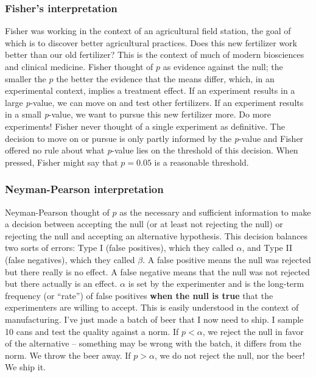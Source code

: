 \documentclass[]{book}
\begin{document}
\subsubsection{Fisher's interpretation}\label{fishers-interpretation}

Fisher was working in the context of an agricultural field station, the
goal of which is to discover better agricultural practices. Does this
new fertilizer work better than our old fertilizer? This is the context
of much of modern biosciences and clinical medicine. Fisher thought of
\(p\) as evidence against the null; the smaller the \(p\) the better the
evidence that the means differ, which, in an experimental context,
implies a treatment effect. If an experiment results in a large
\emph{p}-value, we can move on and test other fertilizers. If an
experiment results in a small \emph{p}-value, we want to pursue this new
fertilizer more. Do more experiments! Fisher never thought of a single
experiment as definitive. The decision to move on or pursue is only
partly informed by the \emph{p}-value and Fisher offered no rule about
what \emph{p}-value lies on the threshold of this decision. When
pressed, Fisher might say that \(p=0.05\) is a reasonable threshold.

\subsubsection{Neyman-Pearson
interpretation}\label{neyman-pearson-interpretation}

Neyman-Pearson thought of \(p\) as the necessary and sufficient
information to make a decision between accepting the null (or at least
not rejecting the null) or rejecting the null and accepting an
alternative hypothesis. This decision balances two sorts of errors: Type
I (false positives), which they called \(\alpha\), and Type II (false
negatives), which they called \(\beta\). A false positive means the null
was rejected but there really is no effect. A false negative means that
the null was not rejected but there actually is an effect. \(\alpha\) is
set by the experimenter and is the long-term frequency (or ``rate'') of
false positives \textbf{when the null is true} that the experimenters
are willing to accept. This is easily understood in the context of
manufacturing. I've just made a batch of beer that I now need to ship. I
sample 10 cans and test the quality against a norm. If \(p < \alpha\),
we reject the null in favor of the alternative -- something may be wrong
with the batch, it differs from the norm. We throw the beer away. If
\(p > \alpha\), we do not reject the null, nor the beer! We ship it.
\end{document}
